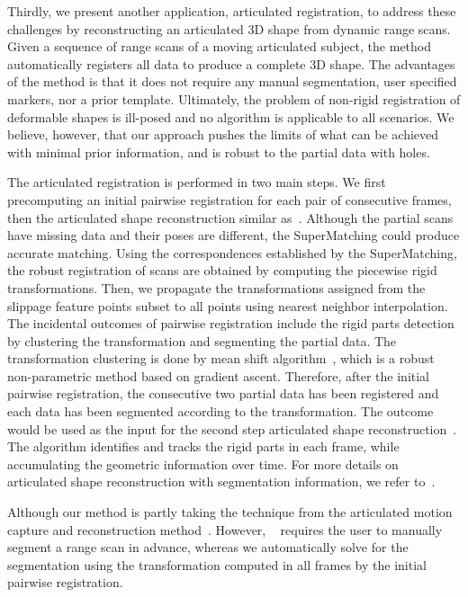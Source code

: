 Thirdly, we present another application, articulated registration, to address these challenges by reconstructing an articulated 3D shape from dynamic range scans. 
Given a sequence of range scans of a moving articulated subject, the method automatically registers all data to produce a complete 3D shape.
The advantages of the method is that it does not require any manual segmentation, user specified markers, nor a prior template.
Ultimately, the problem of non-rigid registration of deformable shapes is ill-posed and no algorithm is applicable to all scenarios. 
We believe, however, that our approach pushes the limits of what can be achieved with minimal prior information, and is robust to the partial data with holes.

The articulated registration is performed in two main steps. 
We first precomputing an initial pairwise registration for each pair of consecutive frames, then the articulated shape reconstruction similar as~\cite{Pekelny08}.
Although the partial scans have missing data and their poses are different, the SuperMatching could produce accurate matching.
Using the correspondences established by the SuperMatching, the robust registration of scans are obtained by computing the piecewise rigid transformations.
Then, we propagate the transformations assigned from the slippage feature points subset to all points using nearest neighbor interpolation.
The incidental outcomes of pairwise registration include the rigid parts detection by clustering the transformation and segmenting the partial data.
The transformation clustering is done by mean shift algorithm~\cite{Comaniciu02}, which is a robust non-parametric method based on gradient ascent.
Therefore, after the initial pairwise registration, the consecutive two partial data has been registered and each data has been segmented according to the transformation. 
The outcome would be used as the input for the second step articulated shape reconstruction~\cite{Pekelny08}.
The algorithm identifies and tracks the rigid parts in each frame, while accumulating the geometric information over time.
For more details on articulated shape reconstruction with segmentation information, we refer to~\cite{Pekelny08}.

Although our method is partly taking the technique from the articulated motion capture and reconstruction method~\cite{Pekelny08}. 
However, ~\cite{Pekelny08} requires the user to manually segment a range scan in advance, 
whereas we automatically solve for the segmentation using the transformation computed in all frames by the initial pairwise registration.

